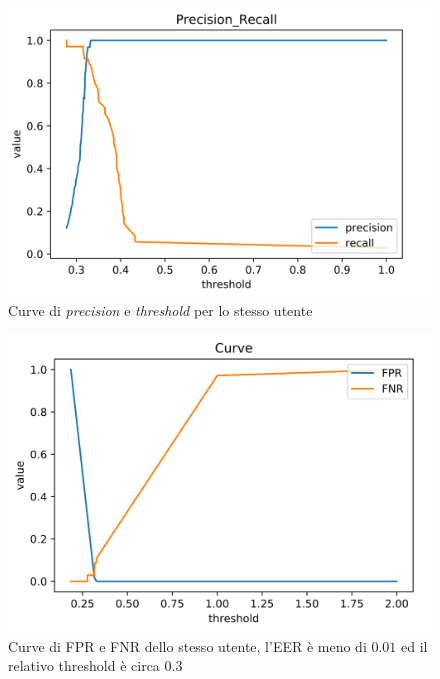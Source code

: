 \documentclass[8pt,notitlepage]{report}
\begin{document}
			\begin{figure}[H]
				\begin{center}
					\includegraphics[scale=.35]{precision_recall_FDTW_Giovanni}
					\caption{Curve di \textit{precision} e \textit{threshold} per lo stesso utente}
				\end{center}
			\end{figure}
			
			\begin{figure}[H]
				\begin{center}
					\includegraphics[scale=.35]{fpr_fnr_FDTW_Giovanni}
					\caption{Curve di FPR e FNR dello stesso utente, l'EER è meno di $ 0.01 $ ed il relativo threshold è circa $ 0.3 $}
				\end{center}
			\end{figure}
			
\end{document}
